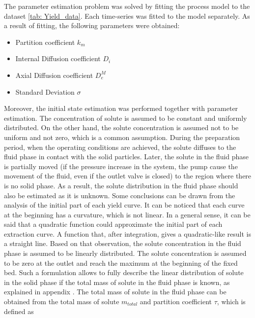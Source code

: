 \documentclass[../Article_Model_Parameters.tex]{subfiles}
\begin{document}
	
	\label{CH: Results}

    The parameter estimation problem was solved by fitting the process model to the dataset \ref{tab: Yield_data}. Each time-series was fitted to the model separately. As a result of fitting, the following parameters were obtained:

    \begin{itemize}
        \item Partition coefficient $k_m$
        \item Internal Diffusion coefficient $D_i$
        \item Axial Diffusion coefficient $D_e^M$
        \item Standard Deviation $\sigma$
    \end{itemize}

    Moreover, the initial state estimation was performed together with parameter estimation. The concentration of solute is assumed to be constant and uniformly distributed. On the other hand, the solute concentration is assumed not to be uniform and not zero, which is a common assumption. During the preparation period, when the operating conditions are achieved, the solute diffuses to the fluid phase in contact with the solid particles. Later, the solute in the fluid phase is partially moved (if the pressure increase in the system, the pump cause the movement of the fluid, even if the outlet valve is closed) to the region where there is no solid phase. As a result, the solute distribution in the fluid phase should also be estimated as it is unknown. Some conclusions can be drawn from the analysis of the initial part of each yield curve. It can be noticed that each curve at the beginning has a curvature, which is not linear. In a general sense, it can be said that a quadratic function could approximate the initial part of each extraction curve. A function that, after integration, gives a quadratic-like result is a straight line. Based on that observation, the solute concentration in the fluid phase is assumed to be linearly distributed. The solute concentration is assumed to be zero at the outlet and reach the maximum at the beginning of the fixed bed. Such a formulation allows to fully describe the linear distribution of solute in the solid phase if the total mass of solute in the fluid phase is known, as explained in appendix . The total mass of solute in the fluid phase can be obtained from the total mass of solute $m_{total}$ and partition coefficient $\tau$, which is defined as
\end{document}
